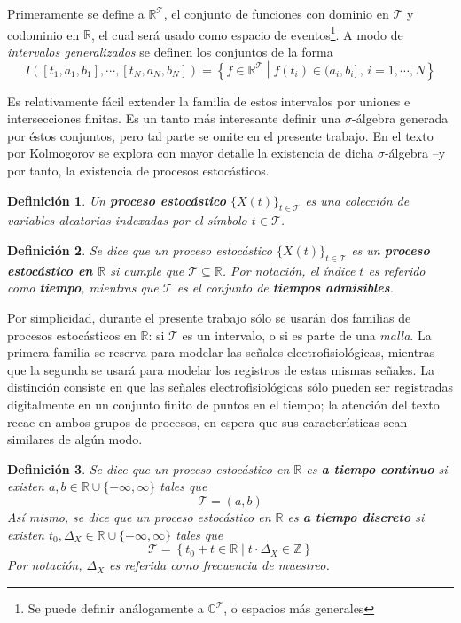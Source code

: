 \documentclass[12pt,letterpaper,draft]{book}
\newtheorem{definicion}{Definición}[chapter]
\newcommand{\R}{\mathbb{R}}
\newcommand{\C}{\mathbb{C}}
\newcommand{\Z}{\mathbb{Z}}
\newcommand{\xt}{$\{X(t)\}_{t\in \mathcal{T}}$ }
\newcommand{\talque}{\mathrel{}\middle|\mathrel{}}
\begin{document}
Primeramente se define a $\R^{\mathcal{T}}$, el conjunto de funciones con dominio en $\mathcal{T}$ y codominio en $\R$, el cual será usado como espacio de eventos\footnote{Se puede definir análogamente a $\C^{\mathcal{T}}$, o espacios más generales}. 
%
A modo de \textit{intervalos generalizados} se definen los conjuntos de la forma
\begin{equation}
I\left( [t_1, a_1, b_1], \cdots, [t_N, a_N, b_N] \right) = 
\left\{ f \in \R^{\mathcal{T}} \talque f(t_i) \in (a_i, b_i] \, , \, i = 1, \cdots, N \right\}
\end{equation}

Es relativamente fácil extender la familia de estos intervalos por uniones e intersecciones finitas. Es un tanto más interesante definir una $\sigma$-álgebra generada por éstos conjuntos, pero tal parte se omite en el presente trabajo.
%
En el texto por Kolmogorov se explora con mayor detalle la existencia de dicha $\sigma$-álgebra --y por tanto, la existencia de procesos estocásticos.

\begin{definicion}
Un \textbf{proceso estocástico} \xt es una colección de variables aleatorias indexadas por el símbolo $t\in\mathcal{T}$.
\end{definicion}

\begin{definicion}
Se dice que un proceso estocástico \xt es un \textbf{proceso estocástico en $\R$} si cumple que $\mathcal{T} \subseteq \R$.
%
Por notación, el índice $t$ es referido como \textbf{tiempo}, mientras que $\mathcal{T}$ es el conjunto de \textbf{tiempos admisibles}.
\end{definicion}

Por simplicidad, durante el presente trabajo sólo se usarán dos familias de procesos estocásticos en $\R$: si $\mathcal{T}$ es un intervalo, o si es parte de una \textit{malla}. 
%
La primera familia se reserva para modelar las señales electrofisiológicas, mientras que la segunda se usará para modelar los registros de estas mismas señales.
%
La distinción consiste en que las señales electrofisiológicas sólo pueden ser registradas digitalmente en un conjunto finito de puntos en el tiempo; la atención del texto recae en ambos grupos de procesos, en espera que sus características sean similares de algún modo.

\begin{definicion}
Se dice que un proceso estocástico en $\R$ es \textbf{a tiempo continuo} si existen $a, b \in \R \cup \{ -\infty, \infty \}$ tales que
\begin{equation}
\mathcal{T} = (a,b)
\end{equation}
Así mismo, se dice que un proceso estocástico en $\R$ es \textbf{a tiempo discreto} si existen $t_0, \Delta_X \in \R \cup \{ -\infty, \infty \}$ tales que
\begin{equation}
\mathcal{T} = \left\{ t_0 + t \in \R \talque {t} \cdot {\Delta_X} \in \Z \right\}
\end{equation}
Por notación, $\Delta_X$ es referida como \textit{frecuencia de muestreo}.
\end{definicion}
\end{document}
